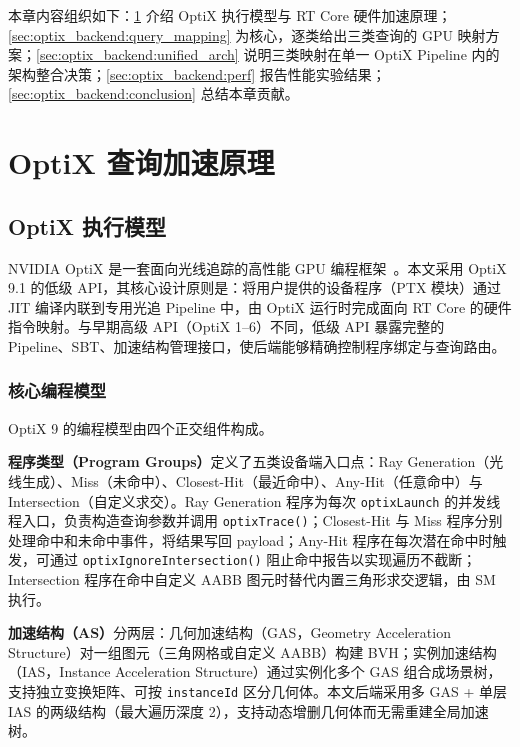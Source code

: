 本章内容组织如下：\ref{sec:optix_backend:optix_principles} 介绍 OptiX 执行模型与 RT Core 硬件加速原理；\ref{sec:optix_backend:query_mapping} 为核心，逐类给出三类查询的 GPU 映射方案；\ref{sec:optix_backend:unified_arch} 说明三类映射在单一 OptiX Pipeline 内的架构整合决策；\ref{sec:optix_backend:perf} 报告性能实验结果；\ref{sec:optix_backend:conclusion} 总结本章贡献。


\section{OptiX 查询加速原理}
\label{sec:optix_backend:optix_principles}

\subsection{OptiX 执行模型}
\label{sec:optix_backend:optix_exec_model}

NVIDIA OptiX 是一套面向光线追踪的高性能 GPU 编程框架~\cite{parkerOptiXGeneralPurpose2010}。本文采用 OptiX 9.1 的低级 API，其核心设计原则是：将用户提供的设备程序（PTX 模块）通过 JIT 编译内联到专用光追 Pipeline 中，由 OptiX 运行时完成面向 RT Core 的硬件指令映射。与早期高级 API（OptiX 1--6）不同，低级 API 暴露完整的 Pipeline、SBT、加速结构管理接口，使后端能够精确控制程序绑定与查询路由。

\subsubsection{核心编程模型}

OptiX 9 的编程模型由四个正交组件构成。

\textbf{程序类型（Program Groups）}定义了五类设备端入口点：Ray Generation（光线生成）、Miss（未命中）、Closest-Hit（最近命中）、Any-Hit（任意命中）与 Intersection（自定义求交）。Ray Generation 程序为每次 \texttt{optixLaunch} 的并发线程入口，负责构造查询参数并调用 \texttt{optixTrace()}；Closest-Hit 与 Miss 程序分别处理命中和未命中事件，将结果写回 payload；Any-Hit 程序在每次潜在命中时触发，可通过 \texttt{optixIgnoreIntersection()} 阻止命中报告以实现遍历不截断；Intersection 程序在命中自定义 AABB 图元时替代内置三角形求交逻辑，由 SM 执行。

\textbf{加速结构（AS）}分两层：几何加速结构（GAS，Geometry Acceleration Structure）对一组图元（三角网格或自定义 AABB）构建 BVH；实例加速结构（IAS，Instance Acceleration Structure）通过实例化多个 GAS 组合成场景树，支持独立变换矩阵、可按 \texttt{instanceId} 区分几何体。本文后端采用多 GAS + 单层 IAS 的两级结构（最大遍历深度 2），支持动态增删几何体而无需重建全局加速树。

